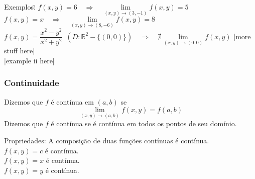 \documentclass{article}
\begin{document}
\begin{tabbing}
  Exemplos:\enspace\= $f(x,y) = 6 \quad \Rightarrow \quad \lim\limits_{(x,y) \to (3,-1)} f(x,y) = 5$ \\
  \> $f(x,y) = x \quad \Rightarrow \quad \lim\limits_{(x,y) \to (8,-6)} f(x,y) = 8$ \\
  \> $f(x,y) = \dfrac{x^2 - y^2}{x^2 + y^2} \enspace \left(D: \mathbb{R}^2 - \{ (0,0) \} \right) \quad \Rightarrow \quad \nexists \lim\limits_{(x,y) \to (0,0)} f(x,y) $ |more stuff here| \\
  \> |example ii here|
\end{tabbing}

\subsubsection{Continuidade}
Dizemos que $f$ é contínua em $(a,b)$ se
\[ \lim_{(x,y) \to (a,b)} f(x,y) = f(a,b) \]
Dizemos que $f$ é contínua se é contínua em todos os pontos de seu domínio.
\begin{tabbing}
  Propriedades: \= A composição de duas funções contínuas é contínua.\\
  \> $f(x,y) = c$ é contínua.\\
  \> $f(x,y) = x$ é contínua.\\
  \> $f(x,y) = y$ é contínua.
\end{tabbing}
\end{document}
